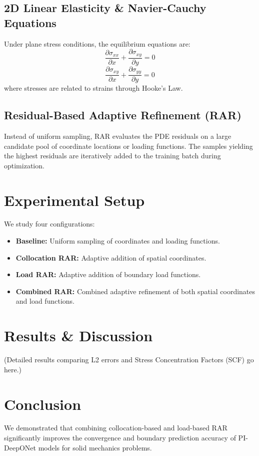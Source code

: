 \documentclass[twocolumn,10pt,journal,compsoc]{IEEEtran}
\begin{document}
\subsection{2D Linear Elasticity & Navier-Cauchy Equations}
Under plane stress conditions, the equilibrium equations are:
\begin{equation}
\frac{\partial \sigma_{xx}}{\partial x} + \frac{\partial \sigma_{xy}}{\partial y} = 0
\end{equation}
\begin{equation}
\frac{\partial \sigma_{xy}}{\partial x} + \frac{\partial \sigma_{yy}}{\partial y} = 0
\end{equation}
where stresses are related to strains through Hooke's Law.

\subsection{Residual-Based Adaptive Refinement (RAR)}
Instead of uniform sampling, RAR evaluates the PDE residuals on a large candidate pool of coordinate locations or loading functions. The samples yielding the highest residuals are iteratively added to the training batch during optimization.

\section{Experimental Setup}
We study four configurations:
\begin{itemize}
    \item \textbf{Baseline:} Uniform sampling of coordinates and loading functions.
    \item \textbf{Collocation RAR:} Adaptive addition of spatial coordinates.
    \item \textbf{Load RAR:} Adaptive addition of boundary load functions.
    \item \textbf{Combined RAR:} Combined adaptive refinement of both spatial coordinates and load functions.
\end{itemize}

\section{Results \& Discussion}
(Detailed results comparing L2 errors and Stress Concentration Factors (SCF) go here.)

\section{Conclusion}
We demonstrated that combining collocation-based and load-based RAR significantly improves the convergence and boundary prediction accuracy of PI-DeepONet models for solid mechanics problems.



\end{document}
